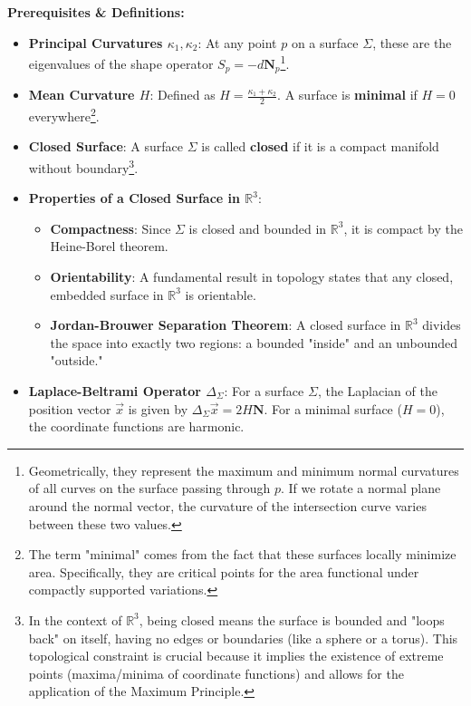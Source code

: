 \begin{solution}
\textbf{Prerequisites \& Definitions:}
\begin{itemize}
    \item \textbf{Principal Curvatures $\kappa_1, \kappa_2$}: At any point $p$ on a surface $\Sigma$, these are the eigenvalues of the shape operator $S_p = -d\mathbf{N}_p$\footnote{Geometrically, they represent the maximum and minimum normal curvatures of all curves on the surface passing through $p$. If we rotate a normal plane around the normal vector, the curvature of the intersection curve varies between these two values.}.
    \item \textbf{Mean Curvature $H$}: Defined as $H = \frac{\kappa_1 + \kappa_2}{2}$. A surface is \textbf{minimal} if $H = 0$ everywhere\footnote{The term "minimal" comes from the fact that these surfaces locally minimize area. Specifically, they are critical points for the area functional under compactly supported variations.}.
    \item \textbf{Closed Surface}: A surface $\Sigma$ is called \textbf{closed} if it is a compact manifold without boundary\footnote{In the context of $\mathbb{R}^3$, being closed means the surface is bounded and "loops back" on itself, having no edges or boundaries (like a sphere or a torus). This topological constraint is crucial because it implies the existence of extreme points (maxima/minima of coordinate functions) and allows for the application of the Maximum Principle.}.
    \item \textbf{Properties of a Closed Surface in $\mathbb{R}^3$}:
    \begin{itemize}
        \item \textbf{Compactness}: Since $\Sigma$ is closed and bounded in $\mathbb{R}^3$, it is compact by the Heine-Borel theorem.
        \item \textbf{Orientability}: A fundamental result in topology states that any closed, embedded surface in $\mathbb{R}^3$ is orientable.
        \item \textbf{Jordan-Brouwer Separation Theorem}: A closed surface in $\mathbb{R}^3$ divides the space into exactly two regions: a bounded "inside" and an unbounded "outside."
    \end{itemize}
    \item \textbf{Laplace-Beltrami Operator $\Delta_{\Sigma}$}: For a surface $\Sigma$, the Laplacian of the position vector $\vec{x}$ is given by $\Delta_{\Sigma} \vec{x} = 2H\mathbf{N}$. For a minimal surface ($H=0$), the coordinate functions are harmonic.
\end{itemize}


\end{solution}

